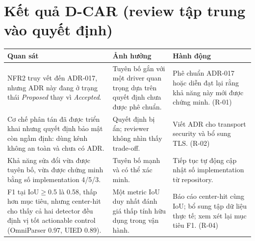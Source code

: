 \documentclass[11pt,a4paper]{report}
\begin{document}
\section{Kết quả D-CAR (review tập trung vào quyết định)}
\begin{longtable}{@{}p{4.6cm}p{5.0cm}p{4.4cm}@{}}
\toprule
\textbf{Quan sát} & \textbf{Ảnh hưởng} & \textbf{Hành động} \\
\midrule
\endhead
NFR2 truy vết đến ADR-017, nhưng ADR này đang ở trạng thái \emph{Proposed} thay vì \emph{Accepted}. & Tuyên bố gắn với một driver quan trọng dựa trên quyết định chưa được phê chuẩn. & Phê chuẩn ADR-017 hoặc diễn đạt lại rằng khả năng này mới được chứng minh. (R-01) \\
Cơ chế phân tán đã được triển khai nhưng quyết định bảo mật còn ngầm định: dùng kênh không an toàn và chưa có ADR. & Quyết định bị ẩn; reviewer không nhìn thấy trade-off. & Viết ADR cho transport security và bổ sung TLS. (R-02) \\
Khả năng sửa đổi vừa được tuyên bố, vừa được chứng minh bằng số implementation 4/5/3. & Tuyên bố mạnh và có thể xác minh. & Tiếp tục tự động cập nhật số implementation từ repository. \\
F1 tại IoU$\geq$0.5 là 0.58, thấp hơn mục tiêu, nhưng center-hit cho thấy cả hai detector đều định vị tốt actionable control (OmniParser 0.97, UIED 0.89). & Một metric IoU duy nhất đánh giá thấp tính hữu dụng trong vận hành. & Báo cáo center-hit cùng IoU; bổ sung tập dữ liệu thực tế; xem xét lại mục tiêu F1. (R-04) \\
\bottomrule
\end{longtable}

\end{document}

